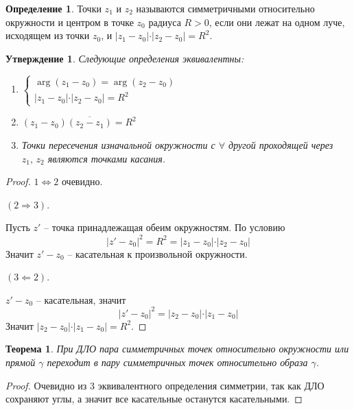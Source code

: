 \documentclass[a4paper,12pt]{article}
\theoremstyle{plain}
\newtheorem{theorem}{Теорема}[section]
\newtheorem{proposition}{Утверждение}[section]
\theoremstyle{definition}
\newtheorem{definition}{Определение}[section]
\theoremstyle{remark}
\begin{document}
\begin{definition}
	Точки $z_1$ и $z_2$ называются симметричными относительно окружности и центром в точке $z_0$ радиуса $R > 0$, если они лежат на одном луче, исходящем из точки $z_0$, и $\vert z_1 - z_0\vert\cdot\vert z_2 - z_0\vert = R^2$.
\end{definition}

\begin{proposition}
	Следующие определения эквивалентны:
	\begin{enumerate}
		\item $\begin{cases}
							\arg(z_1 - z_0) = \arg(z_2 - z_0)\\
							\vert z_1 - z_0\vert\cdot\vert z_2 - z_0\vert = R^2
			      \end{cases}$
		\item $(z_1 - z_0)\overline{(z_2 - z_1)} = R^2$
		\item Точки пересечения изначальной окружности с $\forall$ другой проходящей через $z_1,\, z_2$ являются точками касания.
	\end{enumerate}
\end{proposition}

\begin{proof}
	$1 \Leftrightarrow 2$ очевидно.

	$(2 \Rightarrow 3)$.

	Пусть $z'$ -- точка принадлежащая обеим окружностям. По условию
	\[
		\vert z' - z_0\vert^2 = R^2 = \vert z_1 - z_0	\vert\cdot\vert z_2 - z_0\vert
	\]
	Значит $z' - z_0$ -- касательная к произвольной окружности.

	$(3 \Leftarrow 2)$.

	$z' - z_0$ -- касательная, значит
	\[
		\vert z' - z_0\vert^2 = \vert z_2 - z_0\vert\cdot\vert z_1 - z_0\vert
	\]
	Значит $\vert z_2 - z_0\vert\cdot\vert z_1 - z_0\vert = R^2$.
\end{proof}

\begin{theorem}
	При ДЛО пара симметричных точек относительно окружности или прямой $\gamma$ переходит в пару симметричных точек относительно образа $\gamma$.
\end{theorem}

\begin{proof}
	Очевидно из 3 эквивалентного определения симметрии, так как ДЛО сохраняют углы, а значит все касательные останутся касательными.
\end{proof}
\end{document}
